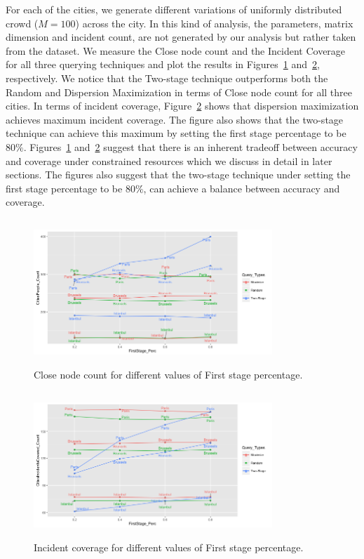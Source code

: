 \documentclass{acm_proc_article-sp}
\begin{document}
For each of the cities, we generate different variations of uniformly distributed crowd ($M = 100$) across the city. In this kind of analysis, the parameters, matrix dimension and incident count, are not generated by our analysis but rather taken from the dataset. We measure the Close node count and the Incident Coverage for all three querying techniques and plot the results in Figures~\ref{fig: hollaCloseCount} and~\ref{fig: hollaIncCoverage}, respectively. We notice that the Two-stage technique outperforms both the Random and Dispersion Maximization in terms of Close node count for all three cities. In terms of incident coverage, Figure~\ref{fig: hollaIncCoverage} shows that dispersion maximization achieves maximum incident coverage. The figure also shows that the two-stage technique can achieve this maximum by setting the first stage percentage to be $80\%$. Figures~\ref{fig: hollaCloseCount} and~\ref{fig: hollaIncCoverage} suggest that there is an inherent tradeoff between accuracy and coverage under constrained resources which we discuss in detail in later sections. The figures also suggest that the two-stage technique under setting the first stage percentage to be $80\%$, can achieve a balance between accuracy and coverage.



\begin{figure}[!h]
\centering
 \includegraphics[width=9cm ,height=5.5cm]{figuresPng/hollaCloseCnt.png}
 \caption{Close node count for different values of First stage percentage. }
 \label{fig: hollaCloseCount}
\end{figure}
\begin{figure}[!h]
\centering
 \includegraphics[width=9cm ,height=5.5cm]{figuresPng/citiesInc.png}
 \caption{Incident coverage for different values of First stage percentage. }
 \label{fig: hollaIncCoverage}
\end{figure}
\end{document}
